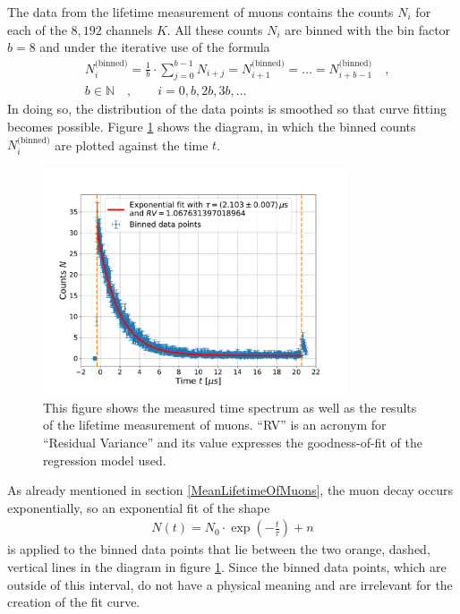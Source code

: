 The data from the lifetime measurement of muons contains the counts $N_i$ for each of the $8,192$ channels $K$.
All these counts $N_i$ are binned with the bin factor $b=8$ and under the iterative use of the formula
\begin{align} \label{Binning}
&N_i^\text{(binned)}=\frac{1}{b}\cdot\sum_{j=0}^{b-1}N_{i+j}=N_{i+1}^\text{(binned)}=\ldots =N_{i+b-1}^\text{(binned)}\quad ,\\
&b\in\mathbb{N}\quad ,\quad\quad i=0,b,2b,3b,\dotsc\nonumber
\end{align}
\noindent In doing so, the distribution of the data points is smoothed so that curve fitting becomes possible.
Figure \ref{MeanLifetime} shows the diagram, in which the binned counts $N_i^\text{(binned)}$ are plotted against the time $t$.
\begin{figure}[H]
	\centering
	\includegraphics[width=0.8\textwidth]{src/MeanLifetime}
	\caption{This figure shows the measured time spectrum as well as the results of the lifetime measurement of muons. \enquote{RV} is an acronym for \enquote{Residual Variance} and its value expresses the goodness-of-fit of the regression model used.}
	\label{MeanLifetime}
\end{figure}
\noindent As already mentioned in section \ref{MeanLifetimeOfMuons}, the muon decay occurs exponentially, so an exponential fit of the shape
\begin{align} \label{exponential}
N(t)=N_0\cdot\exp\left(-\frac{t}{\tau}\right) + n
\end{align}
\noindent is applied to the binned data points that lie between the two orange, dashed, vertical lines in the diagram in figure \ref{MeanLifetime}.
Since the binned data points, which are outside of this interval, do not have a physical meaning and are irrelevant for the creation of the fit curve.

